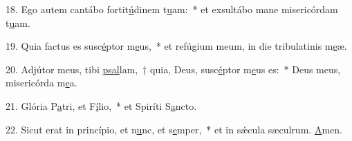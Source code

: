 18. Ego autem cantábo fortit\uline{ú}dinem t\uline{u}am:~* et exsultábo mane misericórdam t\uline{u}am.\par 
19. Quia factus es susc\uline{é}ptor m\uline{e}us,~* et refúgium meum, in die tribulatinis m\uline{e}æ.\par 
20. Adjútor meus, tibi \uline{psal}lam,~† quia, Deus, susc\uline{é}ptor m\uline{e}us es:~* Deus meus, misericórda m\uline{e}a.\par 
21. Glória P\uline{a}tri, et F\uline{í}lio,~* et Spiríti S\uline{a}ncto.\par 
22. Sicut erat in princípio, et n\uline{u}nc, et s\uline{e}mper,~* et in sǽcula sæculrum. \uline{A}men.\par 
